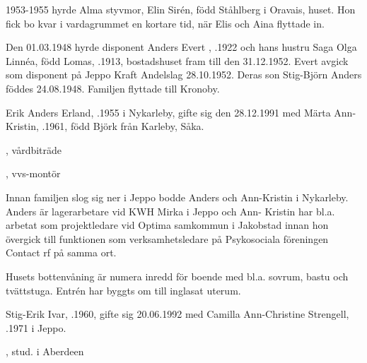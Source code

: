 1953-1955 hyrde Alma  styvmor, Elin Sirén, född Ståhlberg i Oravais, huset. Hon fick bo kvar i vardagrummet en kortare tid, när Elis och Aina flyttade in.

Den 01.03.1948 hyrde disponent Anders Evert , .1922 och hans hustru Saga Olga Linnéa, född Lomas, .1913, bostadshuset fram till den 31.12.1952. Evert avgick som disponent på Jeppo Kraft Andelslag 28.10.1952. Deras son Stig-Björn Anders föddes 24.08.1948. Familjen flyttade till Kronoby.



Erik Anders Erland, .1955 i Nykarleby, gifte sig den 28.12.1991 med Märta Ann-Kristin, .1961, född Björk från Karleby, Såka.
\begin{jhchildren}
  \item {}, vårdbiträde
  \item {}, vvs-montör
\end{jhchildren}


Innan familjen slog sig ner i Jeppo bodde Anders och Ann-Kristin i Nykarleby. Anders är lagerarbetare vid KWH Mirka i Jeppo och Ann-	Kristin har bl.a. arbetat som projektledare vid Optima samkommun i 	Jakobstad innan hon övergick till funktionen som verksamhetsledare 	på Psykosociala föreningen Contact rf på samma ort.

Husets bottenvåning är numera inredd för boende med bl.a. sovrum, bastu och tvättstuga. Entrén har byggts om till inglasat uterum.



Stig-Erik Ivar, .1960, gifte sig 20.06.1992 med Camilla Ann-Christine Strengell, .1971 i Jeppo.
\begin{jhchildren}
  \item {}, stud. i Aberdeen
  \item {}
  \item {}
  \item {}
\end{jhchildren}

